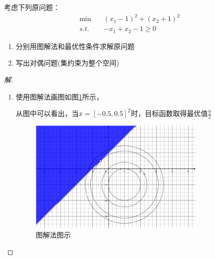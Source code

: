 \documentclass[a4paper]{article}
\begin{document}
\section{}
考虑下列原问题：
\begin{equation}
\begin{aligned}
\min\quad&(x_1-1)^2+(x_2+1)^2 \\
s.t. \quad&-x_1+x_2-1\ge 0
\end{aligned}
\end{equation}
\begin{enumerate}
	\item 分别用图解法和最优性条件求解原问题
	\item 写出对偶问题(集约束为整个空间)
\end{enumerate}
\begin{proof}[解]
	\begin{enumerate}
		\item 
	使用图解法画图如图\ref{fig}所示，
	
	从图中可以看出，当$\bar{x}=[-0.5,0.5]^T$时，目标函数取得最优值$\frac{9}{2}$
	\begin{figure}[h!]
		\centering
		\includegraphics[width=0.8\textwidth]{tujie}
		\caption{\label{fig}图解法图示}
	\end{figure}
	

\end{enumerate}
\end{proof}
\end{document}
